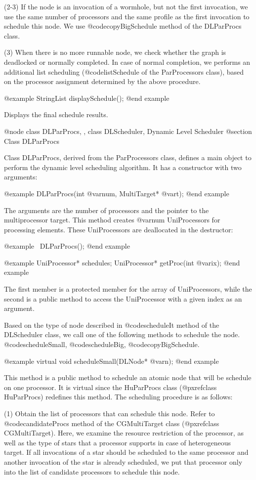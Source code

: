 (2-3) If the node is an invocation of a wormhole, but not the first invocation,
we use the same number of processors and the same profile as the first
invocation to schedule this node. We use @code{copyBigSchedule} method of
the DLParProcs class. 

(3) When there is no more runnable node, we check whether the graph is
deadlocked or normally completed. In case of normal completion, we
performs an additional list scheduling (@code{listSchedule} of 
the ParProcessors class), based on the processor assignment determined
by the above procedure.

@example
StringList displaySchedule();
@end example

Displays the final schedule results.

@node class DLParProcs, , class DLScheduler, Dynamic Level Scheduler
@section Class DLParProcs

Class DLParProcs, derived from the ParProcessors class,
defines a main object to perform the dynamic level scheduling algorithm. 
It has a constructor with two arguments:

@example
DLParProcs(int @var{num}, MultiTarget* @var{t});
@end example

The arguments are the number of processors and the pointer to the
multiprocessor target. This method creates @var{num} UniProcessors for
processing elements. These UniProcessors are deallocated in the destructor:

@example
~DLParProcs();
@end example

@example
UniProcessor* schedules;
UniProcessor* getProc(int @var{ix});
@end example

The first member is a protected member for the array of UniProcessors, while
the second is a public method to access the UniProcessor with a given index
as an argument.

Based on the type of node described in @code{scheduleIt} method of the
DLScheduler class, we call one of the following methods to schedule the node.
@code{scheduleSmall}, @code{scheduleBig}, @code{copyBigSchedule}.

@example
virtual void scheduleSmall(DLNode* @var{n});
@end example

This method is a public method to schedule an atomic node that will be
schedule on one processor. It is virtual since the HuParProcs class
(@pxref{class HuParProcs}) redefines this method.
The scheduling procedure is as follows:

(1) Obtain the list of processors that can schedule this node. Refer to
@code{candidateProcs} method of the CGMultiTarget
class (@pxref{class CGMultiTarget}).  Here, we
examine the resource restriction of the processor, as well as the type of
stars that a processor supports in case of heterogeneous target. If
all invocations of a star should be scheduled to the same processor and
another invocation of the star is already scheduled, we put that processor only
into the list of candidate processors to schedule this node.

